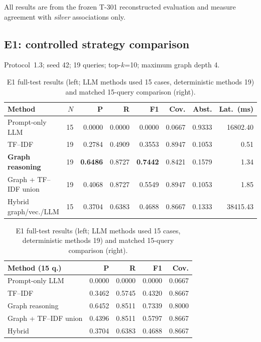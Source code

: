 \documentclass[10pt,twocolumn,a4paper]{extarticle}
\newcommand{\silver}{\emph{silver}}
\newcommand{\tblsize}{\footnotesize}
\begin{document}
All results are from the frozen T-301 reconstructed evaluation and measure agreement with \silver{} associations only.

\subsection{E1: controlled strategy comparison}
Protocol~1.3; seed 42; 19 queries; top-$k$=10; maximum graph depth 4.

\begin{table}[t]
\centering
\caption{E1 full-test results (left; LLM methods used 15 cases, deterministic methods 19) and matched 15-query comparison (right).}
\label{tab:e1full}
\label{tab:e1match}
\renewcommand{\tblsize}{\scriptsize}\setlength{\tabcolsep}{2.5pt}
\begin{minipage}[t]{0.58\textwidth}\centering
\begin{tabular}{@{}l r rrr rr r@{}}
\toprule
\textbf{Method} & $N$ & \textbf{P} & \textbf{R} & \textbf{F1} & \textbf{Cov.} & \textbf{Abst.} & \textbf{Lat.\ (ms)}\\
\midrule
Prompt-only LLM & 15 & 0.0000 & 0.0000 & 0.0000 & 0.0667 & 0.9333 & 16802.40\\
TF--IDF & 19 & 0.2784 & 0.4909 & 0.3553 & 0.8947 & 0.1053 & 0.51\\
\textbf{Graph reasoning} & 19 & \textbf{0.6486} & 0.8727 & \textbf{0.7442} & 0.8421 & 0.1579 & 1.34\\
Graph + TF--IDF union & 19 & 0.4068 & 0.8727 & 0.5549 & 0.8947 & 0.1053 & 1.85\\
Hybrid graph/vec./LLM & 15 & 0.3704 & 0.6383 & 0.4688 & 0.8667 & 0.1333 & 38415.43\\
\bottomrule
\end{tabular}
\end{minipage}\hfill
\begin{minipage}[t]{0.40\textwidth}\centering
\begin{tabular}{@{}l rrr r@{}}
\toprule
\textbf{Method (15 q.)} & \textbf{P} & \textbf{R} & \textbf{F1} & \textbf{Cov.}\\
\midrule
Prompt-only LLM & 0.0000 & 0.0000 & 0.0000 & 0.0667\\
TF--IDF & 0.3462 & 0.5745 & 0.4320 & 0.8667\\
Graph reasoning & 0.6452 & 0.8511 & 0.7339 & 0.8000\\
Graph + TF--IDF union & 0.4396 & 0.8511 & 0.5797 & 0.8667\\
Hybrid & 0.3704 & 0.6383 & 0.4688 & 0.8667\\
\bottomrule
\end{tabular}
\end{minipage}
\end{table}
\end{document}
